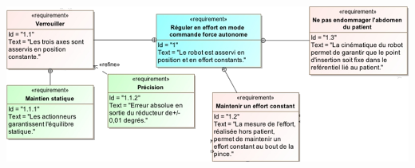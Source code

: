 \documentclass[10pt,fleqn]{article} %
\begin{document}
\fi

\ifprof
\else

\vspace{1cm}
\begin{center}
\includegraphics[width=\linewidth]{images/fig_03}
\end{center}
\fi
\end{document}
